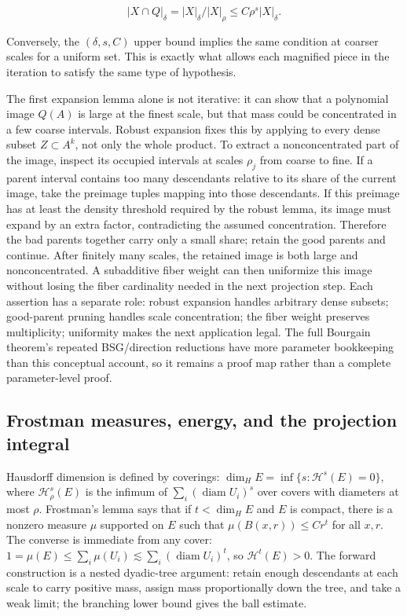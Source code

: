 \[|X\cap Q|_\delta=|X|_\delta/|X|_\rho\le C\rho^s|X|_\delta.\]

Conversely, the \((\delta,s,C)\) upper bound implies the same condition at coarser scales for a uniform set. This is exactly what allows each magnified piece in the iteration to satisfy the same type of hypothesis.

The first expansion lemma alone is not iterative: it can show that a polynomial image \(Q(A)\) is large at the finest scale, but that mass could be concentrated in a few coarse intervals. Robust expansion fixes this by applying to every dense subset \(Z\subset A^k\), not only the whole product. To extract a nonconcentrated part of the image, inspect its occupied intervals at scales \(\rho_j\) from coarse to fine. If a parent interval contains too many descendants relative to its share of the current image, take the preimage tuples mapping into those descendants. If this preimage has at least the density threshold required by the robust lemma, its image must expand by an extra factor, contradicting the assumed concentration. Therefore the bad parents together carry only a small share; retain the good parents and continue. After finitely many scales, the retained image is both large and nonconcentrated. A subadditive fiber weight can then uniformize this image without losing the fiber cardinality needed in the next projection step. Each assertion has a separate role: robust expansion handles arbitrary dense subsets; good-parent pruning handles scale concentration; the fiber weight preserves multiplicity; uniformity makes the next application legal. The full Bourgain theorem's repeated BSG/direction reductions have more parameter bookkeeping than this conceptual account, so it remains a proof map rather than a complete parameter-level proof.

\subsection{Frostman measures, energy, and the projection integral}\label{04-visual-computing-ii-ch033-frostman-measures-energy-and-the-projection-integral}

Hausdorff dimension is defined by coverings: \(\dim_H E=\inf\{s:\mathcal H^s(E)=0\}\), where \(\mathcal H^s_\rho(E)\) is the infimum of \(\sum_i(\operatorname{diam}U_i)^s\) over covers with diameters at most \(\rho\). Frostman's lemma says that if \(t<\dim_H E\) and \(E\) is compact, there is a nonzero measure \(\mu\) supported on \(E\) such that \(\mu(B(x,r))\le Cr^t\) for all \(x,r\). The converse is immediate from any cover: \(1=\mu(E)\le\sum_i\mu(U_i)\lesssim\sum_i(\operatorname{diam}U_i)^t\), so \(\mathcal H^t(E)>0\). The forward construction is a nested dyadic-tree argument: retain enough descendants at each scale to carry positive mass, assign mass proportionally down the tree, and take a weak limit; the branching lower bound gives the ball estimate.

